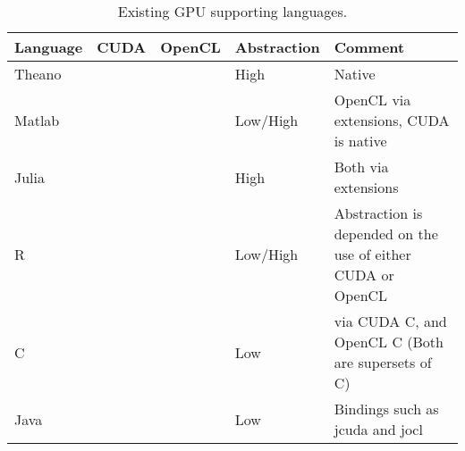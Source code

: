 \begin{table}
	\centering
	\begin{tabular}{|l|c|c|l|l|}
	\hline
	\textbf{Language} & \textbf{CUDA}         & \textbf{OpenCL} & \textbf{Abstraction} & \textbf{Comment}			  		\\ \hline
	Theano   & \cmark           & \cmark            & High      &  Native                                                          \\ \hline
	Matlab   & \cmark           & \cmark            & Low/High        &  OpenCL via extensions, CUDA is native                                                         \\ \hline
	Julia    & \cmark           & \cmark              & High        &  Both via extensions                                                          \\ \hline
	R        & \cmark           & \cmark            & Low/High    & Abstraction is depended on the use of either CUDA or OpenCL \\ \hline
	C   & \cmark           & \cmark            & Low         & via CUDA C, and OpenCL C (Both are supersets of C)                                           \\ \hline
	Java     & \cmark           & \cmark              &   Low          & Bindings such as jcuda and jocl                                            \\ \hline
	\end{tabular}
	\caption{Existing GPU supporting languages. }\label{tbl:sota}
\end{table}
               